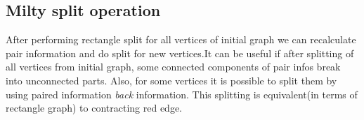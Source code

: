 \documentclass[12pt,a4paper,oneside]{article}
\begin{document}
\subsection{Milty split operation}

After performing rectangle split for all vertices of initial graph we can recalculate pair information and do split for new vertices.It can be useful if after splitting of all vertices from initial graph, some connected components of pair infos break into unconnected parts. 
Also, for some vertices it is possible to split them by using paired information \emph{back} information. This splitting is equivalent(in terms of  rectangle graph) to contracting red edge. 





 

  

  


\end{document}
